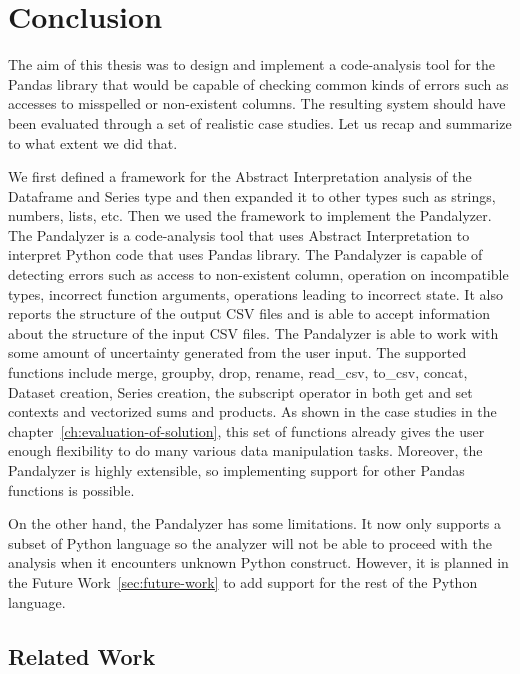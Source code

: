 \chapter*{Conclusion}

The aim of this thesis was to design and implement a code-analysis tool for the Pandas library that would be capable of
checking common kinds of errors such as accesses to misspelled or non-existent columns.
The resulting system should have been evaluated through a set of realistic case studies.
Let us recap and summarize to what extent we did that.

We first defined a framework for the Abstract Interpretation analysis of the Dataframe and Series type and then expanded it
to other types such as strings, numbers, lists, etc.
Then we used the framework to implement the Pandalyzer.
The Pandalyzer is a code-analysis tool that uses Abstract Interpretation to interpret Python code that uses Pandas
library.
The Pandalyzer is capable of detecting errors such as access to non-existent column, operation on incompatible types,
incorrect function arguments, operations leading to incorrect state.
It also reports the structure of the output CSV files and is able to accept information about the structure of the input CSV files.
The Pandalyzer is able to work with some amount of uncertainty generated from the user input.
The supported functions include merge, groupby, drop, rename, read\_csv, to\_csv, concat, Dataset creation,
Series creation, the subscript operator in both get and set contexts and vectorized sums and products.
As shown in the case studies in the chapter~\ref{ch:evaluation-of-solution}, this set of functions already gives
the user enough flexibility to do many various data manipulation tasks.
Moreover, the Pandalyzer is highly extensible, so implementing support for other Pandas functions is possible.

On the other hand, the Pandalyzer has some limitations.
It now only supports a subset of Python language so the analyzer will not be able to proceed with the analysis when
it encounters unknown Python construct.
However, it is planned in the Future Work~\ref{sec:future-work} to add support for the rest of the Python language.

\section*{Related Work}


